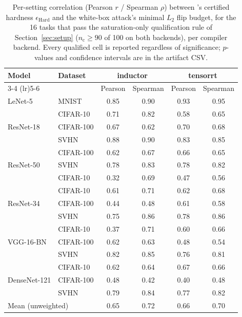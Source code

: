 \begin{table}[t]
{\color{red}%
\centering\small
\setlength{\tabcolsep}{3pt}
\caption{Per-setting correlation (Pearson $r$ / Spearman $\rho$) between \tool's certified hardness $\epsilon_{\mathrm{Hard}}$ and the white-box attack's minimal $L_2$ flip budget, for the 16 tasks that pass the saturation-only qualification rule of Section~\ref{sec:setup} ($n_{\mathrm{c}}\ge90$ of 100 on both backends), per compiler backend. Every qualified cell is reported regardless of significance; $p$-values and confidence intervals are in the artifact CSV.}
\label{tab:robustness}
\begin{tabular}{llcccc}
\toprule
\multirow{2}{*}{Model} & \multirow{2}{*}{Dataset} & \multicolumn{2}{c}{inductor} & \multicolumn{2}{c}{tensorrt} \\
\cmidrule(lr){3-4} \cmidrule(lr){5-6}
& & Pearson & Spearman & Pearson & Spearman \\
\midrule
LeNet-5 & MNIST & 0.85 & 0.90 & 0.93 & 0.95 \\
\midrule
\multirow{3}{*}{ResNet-18} & CIFAR-10 & 0.71 & 0.82 & 0.58 & 0.65 \\
 & CIFAR-100 & 0.67 & 0.62 & 0.70 & 0.68 \\
 & SVHN & 0.88 & 0.90 & 0.83 & 0.85 \\
\midrule
\multirow{3}{*}{ResNet-50} & CIFAR-100 & 0.62 & 0.67 & 0.66 & 0.65 \\
 & SVHN & 0.78 & 0.83 & 0.78 & 0.82 \\
 & CIFAR-10 & 0.32 & 0.69 & 0.47 & 0.56 \\
\midrule
\multirow{3}{*}{ResNet-34} & CIFAR-10 & 0.61 & 0.71 & 0.62 & 0.68 \\
 & CIFAR-100 & 0.44 & 0.48 & 0.61 & 0.58 \\
 & SVHN & 0.75 & 0.86 & 0.78 & 0.86 \\
\midrule
\multirow{3}{*}{VGG-16-BN} & CIFAR-10 & 0.37 & 0.71 & 0.60 & 0.66 \\
 & CIFAR-100 & 0.62 & 0.63 & 0.48 & 0.54 \\
 & SVHN & 0.82 & 0.85 & 0.76 & 0.81 \\
\midrule
\multirow{3}{*}{DenseNet-121} & CIFAR-10 & 0.62 & 0.64 & 0.67 & 0.66 \\
 & CIFAR-100 & 0.48 & 0.42 & 0.40 & 0.48 \\
 & SVHN & 0.79 & 0.84 & 0.77 & 0.82 \\
\midrule
\multicolumn{2}{l}{Mean (unweighted)} & 0.65 & 0.72 & 0.66 & 0.70 \\
\bottomrule
\end{tabular}%
}
\end{table}
